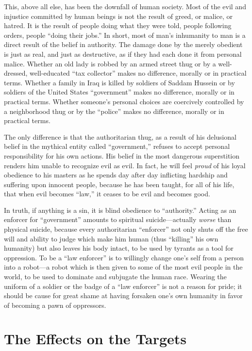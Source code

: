 \documentclass{book}
\begin{document}
This, above all else, has been the downfall of human society. Most of the evil and injustice committed by human beings is not the result of greed, or malice, or hatred. It is the result of people doing what they were told, people following orders, people \enquote{doing their jobs.} In short, most of man's inhumanity to man is a direct result of the belief in authority. The damage done by the merely obedient is just as real, and just as destructive, as if they had each done it from personal malice. Whether an old lady is robbed by an armed street thug or by a well-dressed, well-educated \enquote{tax collector} makes no difference, morally or in practical terms. Whether a family in Iraq is killed by soldiers of Saddam Hussein or by soldiers of the United States \enquote{government} makes no difference, morally or in practical terms. Whether someone's personal choices are coercively controlled by a neighborhood thug or by the \enquote{police} makes no difference, morally or in practical terms.

The only difference is that the authoritarian thug, as a result of his delusional belief in the mythical entity called \enquote{government,} refuses to accept personal responsibility for his own actions. His belief in the most dangerous superstition renders him unable to recognize evil as evil. In fact, he will feel \emph{proud} of his loyal obedience to his masters as he spends day after day inflicting hardship and suffering upon innocent people, because he has been taught, for all of his life, that when evil becomes \enquote{law,} it ceases to be evil and becomes good.

In truth, if anything is a sin, it is blind obedience to \enquote{authority.} Acting as an enforcer for \enquote{government} amounts to spiritual suicide---actually \emph{worse} than physical suicide, because every authoritarian \enquote{enforcer} not only shuts off the free will and ability to judge which make him human (thus \enquote{killing} his own humanity) but also leaves his body intact, to be used by tyrants as a tool for oppression. To be a \enquote{law enforcer} is to willingly change one's self from a person into a robot---a robot which is then given to some of the most evil people in the world, to be used to dominate and subjugate the human race. Wearing the uniform of a soldier or the badge of a \enquote{law enforcer} is not a reason for pride; it should be cause for great shame at having forsaken one's own humanity in favor of becoming a pawn of oppressors.

\chapter{The Effects on the Targets}
\end{document}
